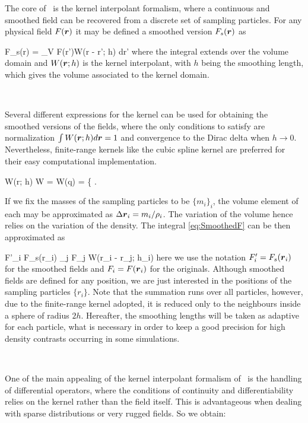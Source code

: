 \documentclass[a4,useAMS,usenatbib,usegraphicx,12pt]{article}
\begin{document}
The core of \SPH\ is the kernel interpolant formalism, where a continuous and
smoothed field can be recovered from a discrete set of sampling particles. For
any physical field $F(\boldsymbol{ r })$ it may be defined a smoothed version $F_s(\boldsymbol{ r })$
as

{ F_s(\bds r) = \int_V \bds F(\bds r')W(\bds r - \bds r'; h) d\bds r' }
where the integral extends over the volume domain and $W(\boldsymbol{ r };h)$ is the 
kernel interpolant, with $h$ being the smoothing length, which gives the volume
associated to the kernel domain. 

\

Several different expressions for the kernel can be used for obtaining the 
smoothed versions of the fields, where the only conditions to satisfy are 
normalization $\int W(\boldsymbol{ r }; h)d\boldsymbol{ r }= 1$ and convergence to the Dirac delta 
when $h\rightarrow 0$. Nevertheless, finite-range kernels like the cubic spline 
kernel are preferred for their easy computational implementation.

{ W(r; h) \equiv W = W(q) = 
\left\{  \right. }

If we fix the masses of the sampling particles to be $\{m_i\}_i$, the volume
element of each may be approximated as $\Delta \boldsymbol{ r }_i = m_i/\rho_i$. The 
variation of the volume hence relies on the variation of the density. The 
integral \ref{eq:SmoothedF} can be then approximated as

{ F'_i \equiv F_s(\bds r_i) \approx \sum_j F_j 
W(\bds r_i - \bds r_j; h_i) }
here we use the notation $F'_i = F_s(\boldsymbol{ r }_i)$ for the smoothed fields and
$F_i = F(\boldsymbol{ r }_i)$ for the originals. Although smoothed fields are defined 
for any position, we are just interested in the positions of the sampling 
particles $\{r_i\}$. Note that the summation runs over all particles, however, 
due to the finite-range kernel adopted, it is reduced only to the neighbours 
inside a sphere of radius $2h$. Hereafter, the smoothing lengths will be taken 
as adaptive for each particle, what is necessary in order to keep a good 
precision for high density contrasts occurring in some simulations.

\

One of the main appealing of the kernel interpolant formalism of \SPH\ is the
handling of differential operators, where the conditions of continuity and 
differentiability relies on the kernel rather than the field itself. This is 
advantageous when dealing with sparse distributions or very rugged fields. So
we obtain:
\end{document}
